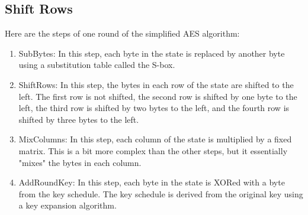 \documentclass[11pt]{article}
\begin{document}
\subsection{Shift Rows}






Here are the steps of one round of the simplified AES algorithm:

\begin{enumerate}
	\item SubBytes: In this step, each byte in the state is replaced by another byte using a substitution table called the S-box.
	
	\item ShiftRows: In this step, the bytes in each row of the state are shifted to the left. The first row is not shifted, the second row is shifted by one byte to the left, the third row is shifted by two bytes to the left, and the fourth row is shifted by three bytes to the left.
	
	\item MixColumns: In this step, each column of the state is multiplied by a fixed matrix. This is a bit more complex than the other steps, but it essentially "mixes" the bytes in each column.
	
	\item AddRoundKey: In this step, each byte in the state is XORed with a byte from the key schedule. The key schedule is derived from the original key using a key expansion algorithm.
\end{enumerate}
	
\end{document}
